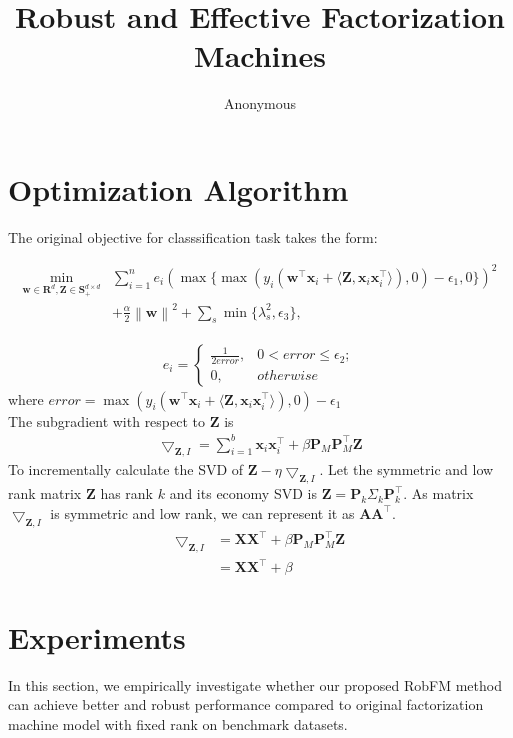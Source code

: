 \documentclass[letterpaper]{article} %
\newcommand\norm[1]{\left\lVert#1\right\rVert}
\def \x {\mathbf{x}}
\def \X {\mathbf{X}}
\def \w {\mathbf{w}}
\def \Z {\mathbf{Z}}
\def \A {\mathbf{A}}
\def \P {\mathbf{P}}
\begin{document}
%
\title{Robust and Effective Factorization Machines}
\author{Anonymous
}
\maketitle

\section{Optimization Algorithm}
The original objective for classsification task takes the form:
\begin{small}
\begin{align}
	\min_{\w \in \mathbf{R}^d,\Z \in \mathbf{S}_{+}^{d \times d}} &\sum_{i=1}^{n}e_i(\max\{\max(y_i(\w^\top\x_i+\langle\Z, \x_i\x_i^\top\rangle),0)-\epsilon_1,0\})^2 \nonumber \\ 
	&+ \frac{\alpha}{2}\norm{\w}^2 + \sum_s\min\{\lambda_s^2, \epsilon_3\},
\end{align}
\end{small}
\begin{align}
e_i=
	\begin{cases}
	\frac{1}{2error},& 0 < error \leq \epsilon_2;\\
	0, & otherwise
	\end{cases}\nonumber
\end{align}
where $error=\max(y_i(\w^\top\x_i+\langle\Z, \x_i\x_i^\top\rangle),0)-\epsilon_1$\\
The subgradient with respect to $\Z$ is
\begin{align}
\bigtriangledown_{\Z, I} = \sum_{i=1}^{b}{\x_i\x_i^\top} + \beta\P_M\P_M^\top\Z 
\end{align}
To incrementally calculate the SVD of $\Z - \eta \bigtriangledown_{\Z,I}$. Let the symmetric and low rank matrix $\Z$ has rank $k$ and its economy SVD is $\Z=\P_k\Sigma_k\P_k^\top$.
As matrix $\bigtriangledown_{\Z,I}$ is symmetric and low rank, we can represent it as $\A \A^\top$.
\begin{align}
\bigtriangledown_{\Z,I}&=\X\X^\top + \beta\P_M\P_M^\top\Z \\ \nonumber
&= \X\X^\top + \beta
\end{align}

\section{Experiments}
In this section, we empirically investigate whether our proposed RobFM method can achieve better and robust performance compared to original factorization machine model with fixed rank on benchmark datasets.
\end{document}
